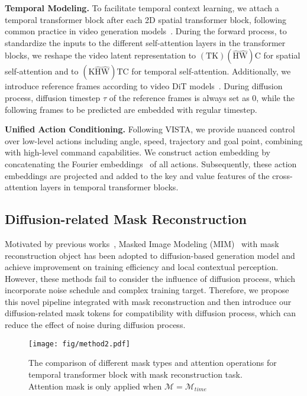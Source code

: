 \noindent\textbf{Temporal Modeling.}
To facilitate temporal context learning, we attach a temporal transformer block after each 2D spatial transformer block, following common practice in video generation models~\cite{videoldm, Open-Sora}. During the forward process, to standardize the inputs to the different self-attention layers in the transformer blocks, we reshape the video latent representation to $\mathrm{(TK)(\hat{H}\hat{W})C}$ for spatial self-attention and to $\mathrm{(K\hat{H}\hat{W})TC}$ for temporal self-attention. Additionally, we introduce reference frames according to video DiT models~\cite{Open-Sora, gao2024lumina}. During diffusion process, diffusion timestep $\tau$ of the reference frames is always set as $0$, while the following frames to be predicted are embedded with regular timestep. 

\noindent\textbf{Unified Action Conditioning.}
Following VISTA, we provide nuanced control over low-level actions including angle, speed, trajectory and goal point, combining with high-level command capabilities. We construct action embedding by concatenating the Fourier embeddings~\cite{tancik2020fourier} of all actions. Subsequently, these action embeddings are projected and added to the key and value features of the cross-attention layers in temporal transformer blocks.

\subsection{Diffusion-related Mask Reconstruction}
\label{sec:3.2}
Motivated by previous works~\cite{maskdit,sd_dit}, Masked Image Modeling (MIM)~\cite{mae,simmim} with mask reconstruction object has been adopted to diffusion-based generation model and achieve improvement on training efficiency and local contextual perception. However, these methods fail to consider the influence of diffusion process, which incorporate noise schedule and complex training target. Therefore, we propose this novel pipeline integrated with mask reconstruction and then introduce our diffusion-related mask tokens for compatibility with diffusion process, which can reduce the effect of noise during diffusion process.
\begin{figure*}[t]
  \centering
   \texttt{[image: fig/method2.pdf]}
   \caption{The comparison of different mask types and attention operations for temporal transformer block with mask reconstruction task. Attention mask is only applied when $\mathcal{M} = \mathcal{M}_{time}$}
   \label{fig:method2}
\end{figure*}

